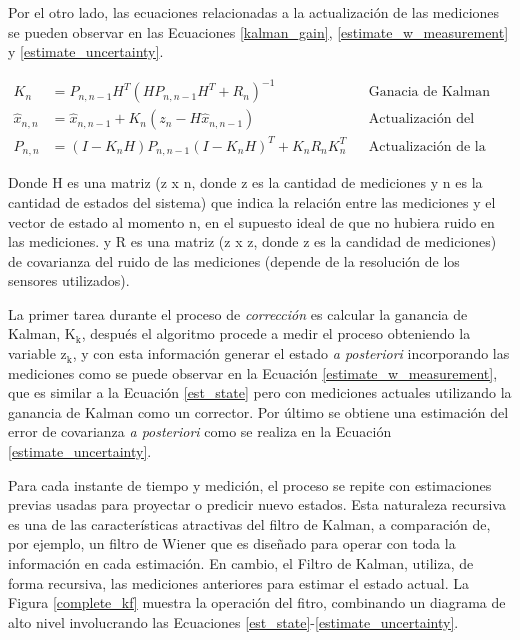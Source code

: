 \noindent Por el otro lado, las ecuaciones relacionadas a la actualizaci\'on de 
las mediciones se pueden observar en las Ecuaciones \ref{kalman_gain},
\ref{estimate_w_measurement} y \ref{estimate_uncertainty}.

\begin{align}
    K_n &= P_{n, n-1}H^T(HP_{n,n-1}H^T + R_n)^{-1} & & \textrm{Ganacia de Kalman}
    \label{kalman_gain}\\
    \hat{x}_{n, n} &= \hat{x}_{n,n-1} + K_n \left(z_n - H\hat{x}_{n, n-1}\right) & & \textrm{Actualizaci\'on del estado}
    \label{estimate_w_measurement}\\
    P_{n, n} &= \left(I - K_nH\right)P_{n,n-1}\left(I - K_nH\right)^T + K_n R_{n} K_n^T & & \textrm{Actualizaci\'on de la covarianza}
    \label{estimate_uncertainty}
\end{align}
\FloatBarrier

\noindent Donde H es una matriz (z x n, donde z es la cantidad de mediciones y n
es la cantidad de estados del sistema) que indica la relación entre las
mediciones y el vector de estado al momento n, en el supuesto ideal de que no
hubiera ruido en las mediciones. y R es una matriz (z x z, donde z es la
candidad de mediciones) de covarianza del ruido de las mediciones (depende de la
resolución de los sensores utilizados).

\noindent La primer tarea durante el proceso de \emph{correcci\'on} es calcular 
la ganancia de Kalman, $\mathrm{K_k}$, despu\'es el algoritmo procede a medir el
proceso obteniendo la variable $\mathrm{z_k}$, y con esta informaci\'on generar
el estado \emph{a posteriori} incorporando las mediciones como se puede observar
en la Ecuaci\'on \ref{estimate_w_measurement}, que es similar a la Ecuaci\'on
\ref{est_state} pero con mediciones actuales utilizando la ganancia de Kalman
como un corrector. Por \'ultimo se obtiene una estimaci\'on del error de
covarianza \emph{a posteriori} como se realiza en la Ecuaci\'on
\ref{estimate_uncertainty}. 

\noindent Para cada instante de tiempo y medici\'on, el proceso se repite con 
estimaciones previas usadas para proyectar o predicir nuevo estados. Esta 
naturaleza recursiva es una de las caracter\'isticas atractivas del filtro de 
Kalman, a comparaci\'on de, por ejemplo, un filtro de Wiener \cite{brown_hwang} 
que es diseñado para operar con toda la informaci\'on en cada estimaci\'on. 
En cambio, el Filtro de Kalman, utiliza, de forma recursiva, las mediciones 
anteriores para estimar el estado actual. La Figura \ref{complete_kf} muestra la 
operaci\'on del fitro, combinando un diagrama de alto nivel involucrando las 
Ecuaciones \ref{est_state}-\ref{estimate_uncertainty}.

